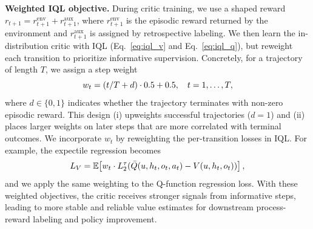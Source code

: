 \documentclass{article}
\theoremstyle{plain}
\theoremstyle{definition}
\theoremstyle{remark}
\begin{document}
\textbf{Weighted IQL objective.}
During critic training, we use a shaped reward
$r_{t+1}=r^{\text{env}}_{t+1}+r^{\text{aux}}_{t+1}$,
where $r^{\text{env}}_{t+1}$ is the episodic reward returned by the environment and
$r^{\text{aux}}_{t+1}$ is assigned by retrospective labeling.
We then learn the in-distribution critic with IQL (Eq.~\ref{eq:iql_v} and Eq.~\ref{eq:iql_q}), but reweight each transition to prioritize informative supervision.
Concretely, for a trajectory of length $T$, we assign a step weight
\begin{equation}
\small
    w_t=\left(t/T+d \right)\cdot 0.5+0.5,\quad t=1,\dots,T,
\end{equation}
where $d\in\{0,1\}$ indicates whether the trajectory terminates with non-zero episodic reward.
This design (i) upweights successful trajectories ($d=1$) and (ii) places larger weights on later steps that are more correlated with terminal outcomes.
We incorporate $w_t$ by reweighting the per-transition losses in IQL. For example, the expectile regression becomes
\begin{equation}
\small
    L_V=\mathbb{E}\!\left[w_t \cdot L_2^\tau(\bar{Q}(u, h_t, o_t, a_t)-V(u, h_t, o_t))\right],
\end{equation}
and we apply the same weighting to the Q-function regression loss.
With these weighted objectives, the critic receives stronger signals from informative steps, leading to more stable and reliable value estimates for downstream process-reward labeling and policy improvement.

\end{document}
